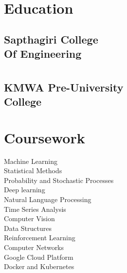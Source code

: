 \documentclass[]{deedy-resume-openfont}
\begin{document}
%
%


%
%

%
%

\begin{minipage}[t]{0.33\textwidth} 


\section{Education} 

\subsection{Sapthagiri College \\ 
Of Engineering}
\section{}
\subsection{KMWA Pre-University \\College}
\sectionsep


\section{Coursework}
\large{Machine Learning \\
Statistical Methods \\
Probability and Stochastic Processes\\
Deep learning\\
Natural Language Processing \\
Time Series Analysis \\
Computer Vision \\
Data Structures \\
Reinforcement Learning \\
Computer Networks \\
Google Cloud Platform \\
Docker and Kubernetes \\}


\end{minipage}
\end{document}
